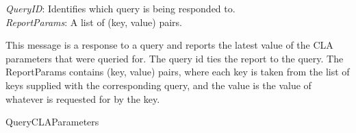{
\metP
    {\em QueryID}: Identifies which query is being responded to.\\
    {\em ReportParams}: A list of (key, value) pairs.
    
\metD
    This message is a response to a query and reports the latest value
    of the CLA parameters that were queried for. The query id ties
    the report to the query. The ReportParams contains (key, value)
    pairs, where each key is taken from the list of keys supplied with
    the corresponding query, and the value is the value of whatever is
    requested for by the key.

\metR
    QueryCLAParameters
}
